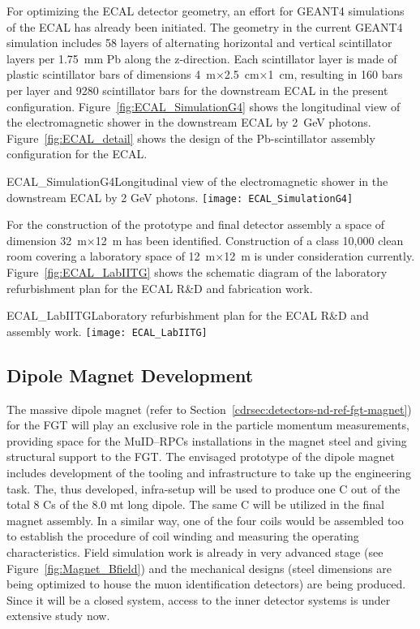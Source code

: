 For optimizing the ECAL detector geometry, an effort for GEANT4
simulations of the ECAL has already been initiated. The geometry in
the current GEANT4 simulation includes 58 layers of alternating
horizontal and vertical scintillator layers per 1.75~mm Pb along the
z-direction. Each scintillator layer is made of plastic scintillator
bars of dimensions 4~m$\times$2.5~cm$\times$1~cm, resulting in 160
bars per layer and 9280 scintillator bars for the downstream ECAL in
the present configuration.  Figure~\ref{fig:ECAL_SimulationG4} shows
the longitudinal view of the electromagnetic shower in the downstream
ECAL by 2~GeV photons. Figure~\ref{fig:ECAL_detail} shows the design
of the Pb-scintillator assembly configuration for the ECAL.
\begin{cdrfigure}  
{ECAL_SimulationG4}{Longitudinal view of the electromagnetic shower in the downstream ECAL by 2 GeV photons.}  
\texttt{[image: ECAL\_SimulationG4]}
\end{cdrfigure}

For the construction of the prototype and final detector assembly a
space of dimension 32~m$\times$12~m has been
identified. Construction of a class 10,000 clean room covering a
laboratory space of 12~m$\times$12~m is under consideration
currently. Figure~\ref{fig:ECAL_LabIITG} shows the schematic diagram
of the laboratory refurbishment plan for the ECAL R\&D and fabrication
work.
\begin{cdrfigure}  
{ECAL_LabIITG}{Laboratory refurbishment plan for the ECAL R\&D and assembly work.}  
\texttt{[image: ECAL\_LabIITG]}
\end{cdrfigure}


\subsection{Dipole Magnet Development} 

The massive dipole magnet (refer to
Section~\ref{cdrsec:detectors-nd-ref-fgt-magnet}) for the FGT will
play an exclusive role in the particle momentum measurements,
providing space for the MuID--RPCs installations in the magnet steel
and giving structural support to the FGT. The envisaged prototype of
the dipole magnet includes development of the tooling and
infrastructure to take up the engineering task.  The, thus developed,
infra-setup will be used to produce one C out of the total 8 Cs of the
8.0 mt long dipole.  The same C will be utilized in the final magnet
assembly. In a similar way, one of the four coils would be assembled
too to establish the procedure of coil winding and measuring the
operating characteristics.  Field simulation work is already in very
advanced stage (see Figure~\ref{fig:Magnet_Bfield}) and the mechanical
designs (steel dimensions are being optimized to house the muon
identification detectors) are being produced.  Since it will be a
closed system, access to the inner detector systems is under extensive
study now.




